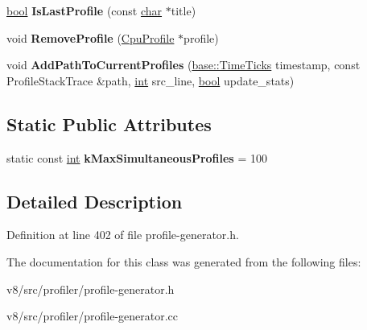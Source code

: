 \begin{DoxyCompactItemize}
\mbox{\label{classv8_1_1internal_1_1CpuProfilesCollection_ac5981b296e5fdb7fb06c22dab3548d64}} 
\mbox{\hyperlink{classbool}{bool}} {\bfseries Is\+Last\+Profile} (const \mbox{\hyperlink{classchar}{char}} $\ast$title)
\item 
\mbox{\label{classv8_1_1internal_1_1CpuProfilesCollection_a4c4bf98364eb1a14e61667f1893faeb4}} 
void {\bfseries Remove\+Profile} (\mbox{\hyperlink{classv8_1_1internal_1_1CpuProfile}{Cpu\+Profile}} $\ast$profile)
\item 
\mbox{\label{classv8_1_1internal_1_1CpuProfilesCollection_afb866b4d20bb483fc2e2658b412f1f02}} 
void {\bfseries Add\+Path\+To\+Current\+Profiles} (\mbox{\hyperlink{classv8_1_1base_1_1TimeTicks}{base\+::\+Time\+Ticks}} timestamp, const Profile\+Stack\+Trace \&path, \mbox{\hyperlink{classint}{int}} src\+\_\+line, \mbox{\hyperlink{classbool}{bool}} update\+\_\+stats)
\end{DoxyCompactItemize}
\subsection*{Static Public Attributes}
\begin{DoxyCompactItemize}
\item 
\mbox{\label{classv8_1_1internal_1_1CpuProfilesCollection_a3c8efd32f53f7fa8fe100cc188d60be7}} 
static const \mbox{\hyperlink{classint}{int}} {\bfseries k\+Max\+Simultaneous\+Profiles} = 100
\end{DoxyCompactItemize}


\subsection{Detailed Description}


Definition at line 402 of file profile-\/generator.\+h.



The documentation for this class was generated from the following files\+:\begin{DoxyCompactItemize}
\item 
v8/src/profiler/profile-\/generator.\+h\item 
v8/src/profiler/profile-\/generator.\+cc\end{DoxyCompactItemize}
